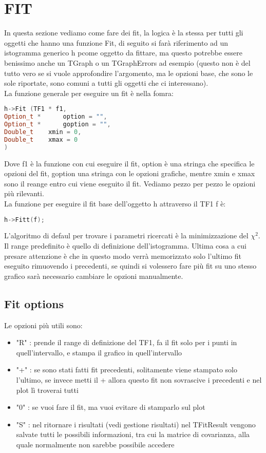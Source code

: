 \chapter{FIT}
In questa sezione vediamo come fare dei fit, la logica è la stessa per tutti gli oggetti che hanno una funzione Fit, di seguito si farà riferimento ad un istogramma generico h pcome oggetto da fittare, ma questo potrebbe essere benissimo anche un TGraph o un TGraphErrors ad esempio (questo non è del tutto vero se si vuole approfondire l'argomento, ma le opzioni base, che sono le sole riportate, sono comuni a tutti gli oggetti che ci interessano).\\
La funzione generale per eseguire un fit è nella fomra:
\begin{lstlisting}[language=C++,label={cod1},mathescape=true,breaklines=true]
h->Fit (TF1 * f1,
Option_t *  	option = "",
Option_t *  	goption = "",
Double_t  	xmin = 0,
Double_t  	xmax = 0 
) 	
\end{lstlisting}
Dove f1 è la funzione con cui eseguire il fit, option è una stringa che specifica le opzioni del fit, goption una stringa con le opzioni grafiche, mentre xmin e xmax sono il reange entro cui viene eseguito il fit. Vediamo pezzo per pezzo le opzioni più rilevanti.\\
La funzione per eseguire il fit base dell'oggetto h attraverso il TF1 f è:
\begin{lstlisting}[language=C++,label={cod1},mathescape=true,breaklines=true]
	h->Fitt(f);
\end{lstlisting}
L'algoritmo di defaul per trovare i parametri ricercati è la minimizzazione del $\chi^2$. Il range predefinito è quello di definizione dell'istogramma. Ultima cosa a cui presare attenzione è che in questo modo verrà memorizzato solo l'ultimo fit eseguito rimuovendo i precedenti, se quindi si volessero fare più fit su uno stesso grafico sarà necessario cambiare le opzioni manualmente.\\
\section{Fit options}
Le opzioni più utili sono:
\begin{itemize}
	\item "R" : prende il range di definizione del TF1, fa il fit solo per i punti in quell'intervallo, e stampa il grafico in quell'intervallo
	\item "+" : se sono stati fatti fit precedenti, solitamente viene stampato solo l'ultimo, se invece metti il + allora questo fit non sovrascive i precedenti e nel plot lì troverai tutti
	\item "0" : se vuoi fare il fit, ma vuoi evitare di stamparlo sul plot
	\item "S" : nel ritornare i risultati (vedi gestione risultati) nel TFitResult vengono salvate tutti le possibili informazioni, tra cui la matrice di covarianza, alla quale normalmente non sarebbe possibile accedere
\end{itemize}

